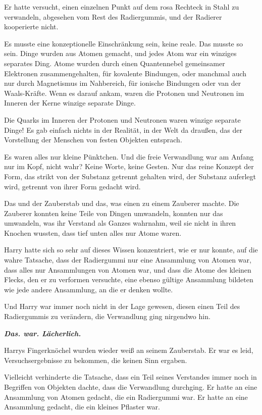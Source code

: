 {Er hatte versucht, einen einzelnen Punkt auf dem rosa Rechteck in Stahl zu verwandeln, abgesehen vom Rest des Radiergummis, und der Radierer kooperierte nicht.

Es musste eine konzeptionelle Einschränkung sein, keine reale. Das musste so sein. Dinge wurden aus Atomen gemacht, und jedes Atom war ein winziges separates Ding. Atome wurden durch einen Quantennebel gemeinsamer Elektronen zusammengehalten, für kovalente Bindungen, oder manchmal auch nur durch Magnetismus im Nahbereich, für ionische Bindungen oder van der Waals-Kräfte. Wenn es darauf ankam, waren die Protonen und Neutronen im Inneren der Kerne winzige separate Dinge.

Die Quarks im Inneren der Protonen und Neutronen waren winzige separate Dinge! Es gab einfach nichts in der Realität, in der Welt da draußen, das der Vorstellung der Menschen von festen Objekten entsprach.

Es waren alles nur kleine Pünktchen. Und die freie Verwandlung war am Anfang nur im Kopf, nicht wahr? Keine Worte, keine Gesten. Nur das reine Konzept der Form, das strikt von der Substanz getrennt gehalten wird, der Substanz auferlegt wird, getrennt von ihrer Form gedacht wird.

Das und der Zauberstab und das, was einen zu einem Zauberer machte. Die Zauberer konnten keine Teile von Dingen umwandeln, konnten nur das umwandeln, was ihr Verstand als Ganzes wahrnahm, weil sie nicht in ihren Knochen wussten, dass tief unten alles nur Atome waren.

Harry hatte sich so sehr auf dieses Wissen konzentriert, wie er nur konnte, auf die wahre Tatsache, dass der Radiergummi nur eine Ansammlung von Atomen war, dass alles nur Ansammlungen von Atomen war, und dass die Atome des kleinen Flecks, den er zu verformen versuchte, eine ebenso gültige Ansammlung bildeten wie jede andere Ansammlung, an die er denken wollte.

Und Harry war immer noch nicht in der Lage gewesen, diesen einen Teil des Radiergummis zu verändern, die Verwandlung ging nirgendwo hin.

\textbf{\emph{Das. war. Lächerlich.}}

Harrys Fingerknöchel wurden wieder weiß an seinem Zauberstab. Er war es leid, Versuchsergebnisse zu bekommen, die keinen Sinn ergaben.

Vielleicht verhinderte die Tatsache, dass ein Teil seines Verstandes immer noch in Begriffen von Objekten dachte, dass die Verwandlung durchging. Er hatte an eine Ansammlung von Atomen gedacht, die ein Radiergummi war. Er hatte an eine Ansammlung gedacht, die ein kleines Pflaster war.

}
